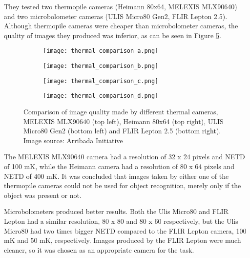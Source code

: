 They tested two thermopile cameras (Heimann 80x64, MELEXIS MLX90640) and two microbolometer cameras (ULIS Micro80 Gen2, FLIR Lepton 2.5).
Although thermopile cameras were cheaper than microbolometer cameras, the quality of images they produced was inferior, as can be seen in Figure \ref{thermal_comparison_images}.
\clearpage
\begin{figure}[ht]
    \begin{subfigure}{0.5\textwidth}
        \centering
        \texttt{[image: thermal\_comparison\_a.png]} 
        \label{thermal_comparison_a}
    \end{subfigure}
    \begin{subfigure}{0.5\textwidth}
        \centering
        \texttt{[image: thermal\_comparison\_b.png]} 
        \label{thermal_comparison_b}
    \end{subfigure}
    \begin{subfigure}{0.5\textwidth}
        \centering
        \texttt{[image: thermal\_comparison\_c.png]} 
        \label{thermal_comparison_c}
    \end{subfigure}
    \begin{subfigure}{0.5\textwidth}
        \centering
        \texttt{[image: thermal\_comparison\_d.png]} 
        \label{thermal_comparison_d}
    \end{subfigure}
\caption[Comparison of image quality made by different thermal cameras.]{Comparison of image quality made by different thermal cameras, MELEXIS MLX90640 (top left), Heimann 80x64 (top right), ULIS Micro80 Gen2 (bottom left) and FLIR Lepton 2.5 (bottom right). Image source: Arribada Initiative \cite{thermal_comparison}}
    \label{thermal_comparison_images}
\end{figure}

The MELEXIS MLX90640 camera had a resolution of 32 x 24 pixels and NETD of 100 \si{\milli\kelvin}, while the Heimann camera had a resolution of 80 x 64 pixels and NETD of 400 \si{\milli\kelvin}.
It was concluded that images taken by either one of the thermopile cameras could not be used for object recognition, merely only if the object was present or not\cite{thermal_comparison}.

Microbolometers produced better results.
Both the Ulis Micro80 and FLIR Lepton had a similar resolution, 80 x 80 and 80 x 60 respectively, but the Ulis Micro80 had two times bigger NETD compared to the FLIR Lepton camera, 100 \si{\milli\kelvin} and 50 \si{\milli\kelvin}, respectively.
Images produced by the FLIR Lepton were much cleaner, so it was chosen as an appropriate camera for the task.

